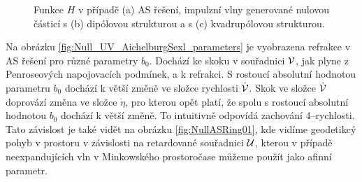 \begin{figure}[h]
    \centering
    \begin{subfigure}[b]{0.32\textwidth}
       \caption{}
    \end{subfigure}
     \hfill
     \begin{subfigure}[b]{0.32\textwidth}
       \caption{}
     \end{subfigure}
     \hfill
     \begin{subfigure}[b]{0.32\textwidth}
       \caption{}
     \end{subfigure}
    \caption{Funkce $H$ v případě (a) AS řešení, impulzní vlny generované nulovou částicí s (b) dipólovou strukturou a s (c) kvadrupólovou strukturou.}
    \label{fig:mono_di_kvadru}
\end{figure}

Na obrázku \ref{fig:Null_UV_AichelburgSexl_parameters} je vyobrazena refrakce v AS řešení pro různé
parametry $b_0$. Dochází ke skoku v souřadnici $\mathcal{V}$, jak plyne z Penroseových napojovacích podmínek, a k refrakci.
S rostoucí absolutní hodnotou parametru $b_0$ dochází k větší změně ve složce rychlosti $\dot {\mathcal{V}}$.
Skok ve složce $\dot {\mathcal{V}}$ doprovází změna ve složce $\dot \eta$, pro kterou opět platí, že spolu s
rostoucí absolutní hodnotou $b_0$ dochází k větší změně. To intuitivně odpovídá zachování 4--rychlosti.
Tato závislost je také vidět na obrázku \ref{fig:NullASRing01},
kde vidíme geodetikcý pohyb v prostoru v závislosti na retardované souřadnici $\mathcal{U}$, kterou v případě neexpandujících vln
v Minkowského prostoročase můžeme použít jako afinní parametr.

